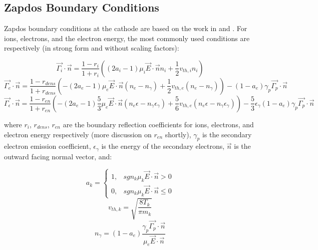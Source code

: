 \subsection{Zapdos Boundary Conditions}
\label{sec:zap_bcs}

Zapdos boundary conditions at the cathode are based on the work in \cite{hagelaar2000boundary} and \cite{sakiyama2007nonthermal}. For ions, electrons, and the electron energy, the most commonly used conditions are respectively (in strong form and without scaling factors):

\begin{equation}
  \vec{\Gamma_i}\cdot\vec{n} = \frac{1-r_i}{1+r_i}\left(\left(2a_i-1\right)\mu_i\vec{E}\cdot\vec{n}n_i + \frac{1}{2}v_{th,i}n_i\right)
  \label{eq:ion_bc}
\end{equation}
\begin{equation}
    \vec{\Gamma_e}\cdot\vec{n} = \frac{1-r_{dens}}{1+r_{dens}}\left(-\left(2a_e-1\right)\mu_e\vec{E}\cdot\vec{n}\left(n_e-n_{\gamma}\right) + \frac{1}{2}v_{th,e}\left(n_e-n_{\gamma}\right)\right) - \left(1-a_e\right)\gamma_p\vec{\Gamma_p}\cdot\vec{n}
  \label{eq:electron_bc}
\end{equation}
\begin{equation}
    \vec{\Gamma_{\epsilon}}\cdot\vec{n} = \frac{1-r_{en}}{1+r_{en}}\left(-\left(2a_e-1\right)\frac{5}{3}\mu_e\vec{E}\cdot\vec{n}\left(n_e\epsilon-n_{\gamma}\epsilon_{\gamma}\right) + \frac{5}{6}v_{th,e}\left(n_e\epsilon-n_{\gamma}\epsilon_{\gamma}\right)\right) - \frac{5}{3}\epsilon_{\gamma}\left(1-a_e\right)\gamma_p\vec{\Gamma_p}\cdot\vec{n}
  \label{eq:energy_bc}
\end{equation}

where $r_i$, $r_{dens}$, $r_{en}$ are the boundary reflection coefficients for ions, electrons, and electron energy respectively (more discussion on $r_{en}$ shortly), $\gamma_p$ is the secondary electron emission coefficient, $\epsilon_{\gamma}$ is the energy of the secondary electrons, $\vec{n}$ is the outward facing normal vector, and:

\begin{equation}
  a_k =
    \begin{cases}
      1, & sgn_k\mu_k\vec{E}\cdot\vec{n}>0 \\
      0, & sgn_k\mu_k\vec{E}\cdot\vec{n}\leq0
    \end{cases}
  \label{eq:a}
\end{equation}
\begin{equation}
  v_{th,k} = \sqrt{\frac{8T_k}{\pi m_k}}
  \label{eq:v_th}
\end{equation}
\begin{equation}
  n_{\gamma} = \left(1-a_e\right)\frac{\gamma_p\vec{\Gamma_p}\cdot\vec{n}}{\mu_e\vec{E}\cdot\vec{n}}
  \label{eq:n_gamma}
\end{equation}

